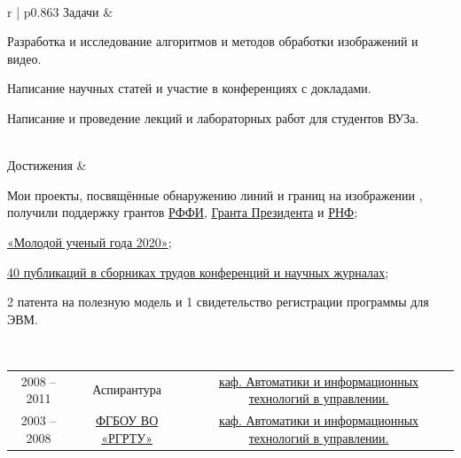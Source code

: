 \documentclass[11pt]{article}
\begin{document}
		\\
		\begin{tabular} {r | p{}}
			Задачи &
			\begin{tabitemize}
				\item Разработка и исследование алгоритмов и методов обработки изображений и видео.
				\item Написание научных статей и участие в конференциях с докладами.
				\item Написание и проведение лекций и лабораторных работ для студентов ВУЗа.
			\end{tabitemize}
			\\
			Достижения &
			\begin{tabitemize}
				\item Мои проекты, посвящённые обнаружению линий и границ на изображении \cite{wrt, mas}, получили поддержку грантов \href{https://www.rfbr.ru/project_search/350568/}{РФФИ}, \href{https://grants.extech.ru/grants/res/winners.php?OZ=9&TZ=K&year=2016}{Гранта Президента} и \href{http://rscf.ru/sites/default/files/docfiles/Winners_0029.pdf}{РНФ};
				\item \href{https://ryazan.bezformata.com/listnews/aspiranti-rgrtu-pobediteli-konkursa/81548415/}{«Молодой ученый года 2020»};
				\item \hyperlink{AutorIDs}{40 публикаций в сборниках трудов конференций и научных журналах};
				\item 2 патента на полезную модель и 1 свидетельство регистрации программы для ЭВМ.
			\end{tabitemize}
		\end{tabular}%
	
	\newpage
	
	\\
	\begin{tabular} {c | c | c}
		2008 -- 2011 & Аспирантура & \href{http://www.rsreu.ru/faculties/faitu/kafedri/aitu}{каф. Автоматики и информационных технологий в управлении.}\\
		2003 -- 2008 & \href{http://www.rsreu.ru/}{ФГБОУ ВО «РГРТУ»} & \href{http://www.rsreu.ru/faculties/faitu/kafedri/aitu}{каф. Автоматики и информационных технологий в управлении.}\\
	\end{tabular}\\
\end{document}
